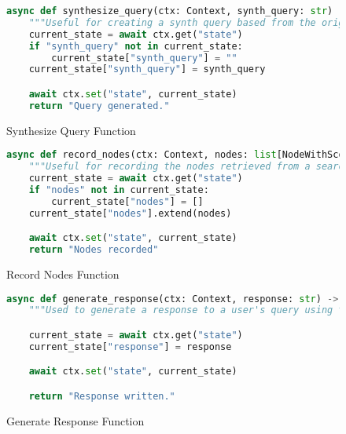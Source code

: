 \begin{figure}[h]
	\centering
	\small
	\begin{lstlisting}[language=Python, breaklines=true]
async def synthesize_query(ctx: Context, synth_query: str) -> str:
    """Useful for creating a synth query based from the original query. Your input should be a generated, synthesized version of the user's query."""
    current_state = await ctx.get("state")
    if "synth_query" not in current_state:
        current_state["synth_query"] = ""
    current_state["synth_query"] = synth_query

    await ctx.set("state", current_state)
    return "Query generated."
    \end{lstlisting}
	\caption{Synthesize Query Function}
\end{figure}

\begin{figure}[h]
	\centering
	\small
	\begin{lstlisting}[language=Python, breaklines=true]
async def record_nodes(ctx: Context, nodes: list[NodeWithScore]) -> str:
    """Useful for recording the nodes retrieved from a search. Your input should be the list of nodes retrieved"""
    current_state = await ctx.get("state")
    if "nodes" not in current_state:
        current_state["nodes"] = []
    current_state["nodes"].extend(nodes)

    await ctx.set("state", current_state)
    return "Nodes recorded"
    \end{lstlisting}
	\caption{Record Nodes Function}
\end{figure}


\begin{figure}[h]
	\centering
	\small
	\begin{lstlisting}[language=Python, breaklines=true]
async def generate_response(ctx: Context, response: str) -> str:
    """Used to generate a response to a user's query using the information retrieved."""

    current_state = await ctx.get("state")
    current_state["response"] = response

    await ctx.set("state", current_state)

    return "Response written."
    \end{lstlisting}
	\caption{Generate Response Function}
\end{figure}
